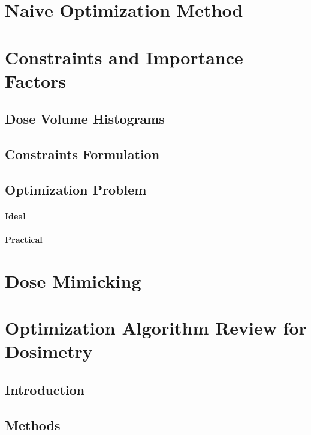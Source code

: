 \section{Naive Optimization Method}
\section{Constraints and Importance Factors}
\subsection[DVHs]{Dose Volume Histograms}
\subsection{Constraints Formulation}
\subsection{Optimization Problem}
\paragraph{Ideal}
\paragraph{Practical}

\section{Dose Mimicking}

\section{Optimization Algorithm Review for Dosimetry}
\subsection{Introduction}

\subsection{Methods}

